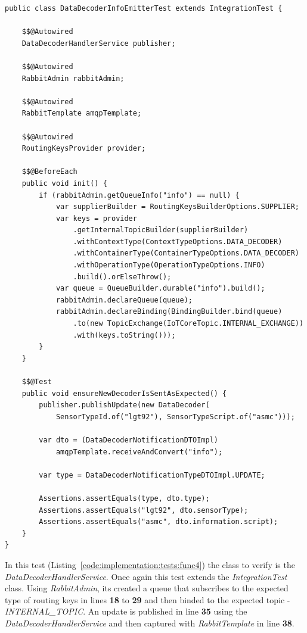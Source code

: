 \begin{lstlisting}[style=Java, caption=Functional Test - Message Broker Interaction - Data Decoder Backend, label={code:implementation:tests:func4}]
public class DataDecoderInfoEmitterTest extends IntegrationTest {

    $$@Autowired
    DataDecoderHandlerService publisher;

    $$@Autowired
    RabbitAdmin rabbitAdmin;

    $$@Autowired
    RabbitTemplate amqpTemplate;

    $$@Autowired
    RoutingKeysProvider provider;

    $$@BeforeEach
    public void init() {
        if (rabbitAdmin.getQueueInfo("info") == null) {
            var supplierBuilder = RoutingKeysBuilderOptions.SUPPLIER;
            var keys = provider
                .getInternalTopicBuilder(supplierBuilder)
                .withContextType(ContextTypeOptions.DATA_DECODER)
                .withContainerType(ContainerTypeOptions.DATA_DECODER)
                .withOperationType(OperationTypeOptions.INFO)
                .build().orElseThrow();
            var queue = QueueBuilder.durable("info").build();
            rabbitAdmin.declareQueue(queue);
            rabbitAdmin.declareBinding(BindingBuilder.bind(queue)
                .to(new TopicExchange(IoTCoreTopic.INTERNAL_EXCHANGE))
                .with(keys.toString()));
        }
    }

    $$@Test
    public void ensureNewDecoderIsSentAsExpected() {
        publisher.publishUpdate(new DataDecoder(
            SensorTypeId.of("lgt92"), SensorTypeScript.of("asmc")));

        var dto = (DataDecoderNotificationDTOImpl)
            amqpTemplate.receiveAndConvert("info");

        var type = DataDecoderNotificationTypeDTOImpl.UPDATE;

        Assertions.assertEquals(type, dto.type);
        Assertions.assertEquals("lgt92", dto.sensorType);
        Assertions.assertEquals("asmc", dto.information.script);
    }
}
\end{lstlisting}

In this test (Listing~\ref{code:implementation:tests:func4}) the class to verify is the \textit{DataDecoderHandlerService}. Once again this test extends the \textit{IntegrationTest} class. Using \textit{RabbitAdmin}, its created a queue that subscribes to the expected type of routing keys in lines \textbf{18} to \textbf{29} and then binded to the expected topic - \textit{INTERNAL\_TOPIC}.
An update is published in line \textbf{35} using the \textit{DataDecoderHandlerService} and then captured with \textit{RabbitTemplate} in line \textbf{38}.

